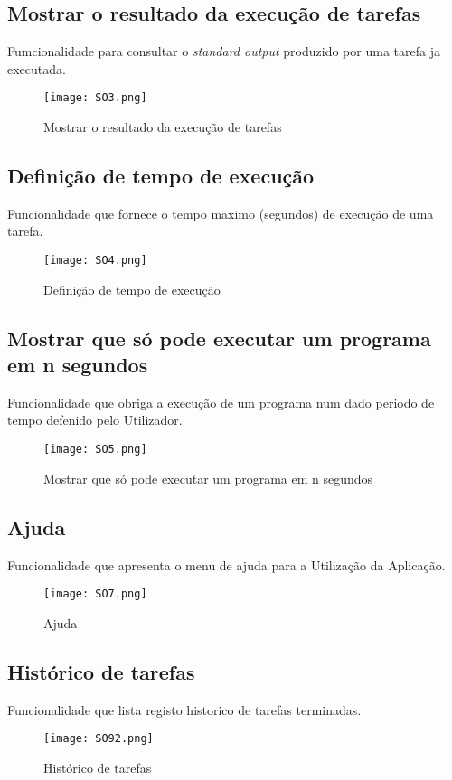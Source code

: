 \documentclass[a4paper]{article}
\begin{document}
\subsection{\textbf{Mostrar o resultado da execução de tarefas}}
Fumcionalidade para consultar o \textit{standard output} produzido por uma tarefa ja executada.
\begin{figure}[H]
\centering
\texttt{[image: SO3.png]}
\caption{Mostrar o resultado da execução de tarefas}
\label{img:Mostrar o resultado da execução de tarefas}
\end{figure}

\subsection{\textbf{Definição de tempo de execução}}
Funcionalidade que fornece o tempo maximo (segundos) de execução de uma tarefa.
\begin{figure}[H]
\centering
\texttt{[image: SO4.png]}
\caption{Definição de tempo de execução}
\label{img:Definição de tempo de execução}
\end{figure}

\subsection{\textbf{Mostrar que só pode executar um programa em n segundos}}
Funcionalidade que obriga a execução de um programa num dado periodo de tempo defenido pelo Utilizador.
\begin{figure}[H]
\centering
\texttt{[image: SO5.png]}
\caption{ Mostrar que só pode executar um programa em n segundos}
\label{img: Mostrar que só pode executar um programa em n segundos}
\end{figure}

\subsection{\textbf{Ajuda}}
Funcionalidade que apresenta o menu de ajuda para a Utilização da Aplicação.
\begin{figure}[H]
\centering
\texttt{[image: SO7.png]}
\caption{Ajuda}
\label{img: Ajuda}
\end{figure}

\subsection{\textbf{Histórico de tarefas}}
Funcionalidade que lista registo historico de tarefas terminadas.
\begin{figure}[H]
\centering
\texttt{[image: SO92.png]}
\caption{Histórico de tarefas}
\label{img: Histórico de tarefas}
\end{figure}
\end{document}
